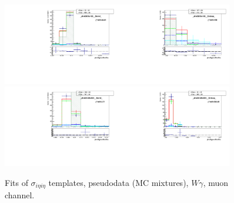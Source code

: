 \begin{figure}[htb]
\begin{center}
   \includegraphics[width=0.45\textwidth]{../figs/figs_v11/MUON_WGamma/TemplateFits/c_TEMPL_SIHIH_UNblind__phoEt95to120__Barrel__RooFit_MCclosure.pdf}\includegraphics[width=0.45\textwidth]{../figs/figs_v11/MUON_WGamma/TemplateFits/c_TEMPL_SIHIH_UNblind__phoEt95to120__Endcap__RooFit_MCclosure.pdf}\\
   \includegraphics[width=0.45\textwidth]{../figs/figs_v11/MUON_WGamma/TemplateFits/c_TEMPL_SIHIH_UNblind__phoEt120to500__Barrel__RooFit_MCclosure.pdf}\includegraphics[width=0.45\textwidth]{../figs/figs_v11/MUON_WGamma/TemplateFits/c_TEMPL_SIHIH_UNblind__phoEt120to500__Endcap__RooFit_MCclosure.pdf}\\
  \label{fig:templateFits_MCclosure_SIHIH_MUON_3}
  \caption{Fits of $\sigma_{i \eta i \eta}$ templates, pseudodata (MC mixtures), $W\gamma$, muon channel.}
  \end{center}
\end{figure}

